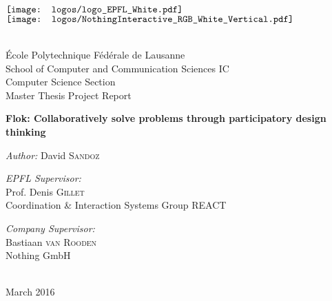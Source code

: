 \pagecolor{rocketorange}
\color{white}

\begin{titlepage}

\begin{center}

\begin{minipage}{6in}
  \centering
  $\vcenter{\hbox{\texttt{[image: logos/logo\_EPFL\_White.pdf]}}}$
  \hspace*{2cm}
  $\vcenter{\hbox{\texttt{[image: logos/NothingInteractive\_RGB\_White\_Vertical.pdf]}}}$
\end{minipage}\\[2 cm]

{\Large École Polytechnique Fédérale de Lausanne}\\[0.5cm]
{\large School of Computer and Communication Sciences IC}\\[0.5cm]
{\large Computer Science Section}\\[0.5cm]
{\LARGE Master Thesis Project Report}\\[0.5cm]

\vspace{1cm}

{\huge \bfseries Flok: Collaboratively solve problems through participatory design thinking}\\[0.4cm]

\vspace{1.5cm}

\large \emph{Author:} David \textsc{Sandoz}\\[1.5cm]

\begin{minipage}{0.5\textwidth}
\begin{flushleft} \large
\emph{EPFL Supervisor:}\\
Prof. Denis \textsc{Gillet}\\
Coordination \& Interaction Systems Group REACT
\end{flushleft}
\end{minipage}
\begin{minipage}{0.4\textwidth}
\begin{flushright} \large
\emph{Company Supervisor:}\\
Bastiaan \textsc{van Rooden}\\
Nothing GmbH\\
~
\end{flushright}
\end{minipage}

\vfill

{\large March 2016}

\end{center}

\end{titlepage}

\pagecolor{white}
\color{black}
